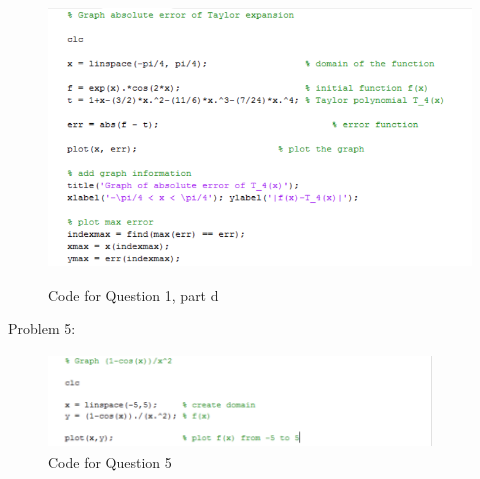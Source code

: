 	\begin{figure}[h!]
		\centering
		\includegraphics[width=5in, height=3in]{script1_2.PNG}
		\caption{Code for Question 1, part d}
		\label{fig:graph5}
	\end{figure}
\newpage
Problem 5:

	\begin{figure}[h!]
		\centering
		\includegraphics[width=4in, height=1in]{script5.PNG}
		\caption{Code for Question 5}
		\label{fig:graph6}
	\end{figure}



